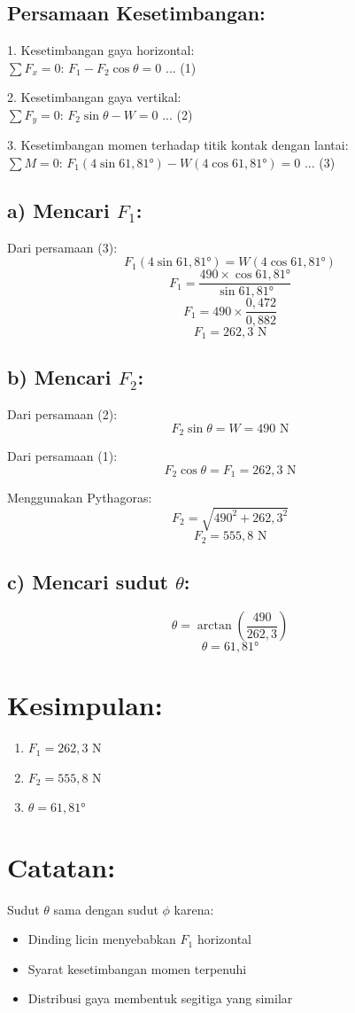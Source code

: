 \documentclass{article}
\begin{document}
\subsection*{Persamaan Kesetimbangan:}
1. Kesetimbangan gaya horizontal:\\
   $\sum F_x = 0$: $F_1 - F_2 \cos \theta = 0$ ... (1)

2. Kesetimbangan gaya vertikal:\\
   $\sum F_y = 0$: $F_2 \sin \theta - W = 0$ ... (2)

3. Kesetimbangan momen terhadap titik kontak dengan lantai:\\
   $\sum M = 0$: $F_1(4 \sin 61,81°) - W(4 \cos 61,81°) = 0$ ... (3)

\subsection*{a) Mencari $F_1$:}
Dari persamaan (3):
\[F_1(4 \sin 61,81°) = W(4 \cos 61,81°)\]
\[F_1 = \frac{490 \times \cos 61,81°}{\sin 61,81°}\]
\[F_1 = 490 \times \frac{0,472}{0,882}\]
\[F_1 = 262,3 \text{ N}\]

\subsection*{b) Mencari $F_2$:}
Dari persamaan (2):
\[F_2 \sin \theta = W = 490 \text{ N}\]

Dari persamaan (1):
\[F_2 \cos \theta = F_1 = 262,3 \text{ N}\]

Menggunakan Pythagoras:
\[F_2 = \sqrt{490^2 + 262,3^2}\]
\[F_2 = 555,8 \text{ N}\]

\subsection*{c) Mencari sudut $\theta$:}
\[\theta = \arctan(\frac{490}{262,3})\]
\[\theta = 61,81°\]

\section*{Kesimpulan:}
\begin{enumerate}
\item $F_1 = 262,3$ N
\item $F_2 = 555,8$ N
\item $\theta = 61,81°$
\end{enumerate}

\section*{Catatan:}
Sudut $\theta$ sama dengan sudut $\phi$ karena:
\begin{itemize}
\item Dinding licin menyebabkan $F_1$ horizontal
\item Syarat kesetimbangan momen terpenuhi
\item Distribusi gaya membentuk segitiga yang similar
\end{itemize}
\end{document}
